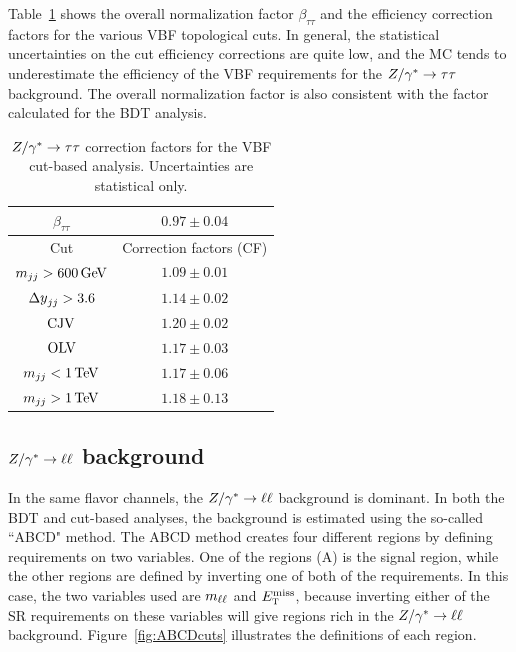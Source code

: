 Table~\ref{tab:vbf_cb_zttnf} shows the overall normalization factor $\beta_{\tau\tau}$ and the efficiency correction factors for the various VBF topological cuts. In general, the statistical uncertainties on the cut efficiency corrections are quite low, and the MC tends to underestimate the efficiency of the VBF requirements for the $Z/\gamma^{\ast}\to\tau\tau$ background. The overall normalization factor is also consistent with the factor calculated for the BDT analysis.

\begin{table}[h!]
\centering
\captionsetup{justification=centering}
\begin{tabular}{|c|c|}
\hline
$\beta_{\tau\tau}$ & $0.97 \pm 0.04$ \\ \hline\hline
 Cut & Correction factors (CF) \\ \hline
$\mjj > 600 \GeV$ & $1.09 \pm 0.01$ \\ \hline
$\dyjj > 3.6 $ & $1.14 \pm 0.02$ \\ \hline
$\rm CJV$ & $1.20 \pm 0.02$ \\ \hline
$\rm OLV$ & $1.17 \pm 0.03$ \\ \hline
$\mjj < 1 \TeV$ & $1.17 \pm 0.06$ \\ \hline
$\mjj > 1 \TeV$ & $1.18 \pm 0.13$ \\ \hline 
\end{tabular}
\caption{$Z/\gamma^{\ast} \to\tau\tau$ correction factors for the VBF cut-based analysis. Uncertainties are statistical only.}
\label{tab:vbf_cb_zttnf}
\end{table}

\subsection{$Z/\gamma^{\ast} \to \ell\ell$ background}

In the same flavor channels, the $Z/\gamma^{\ast} \to \ell\ell$ background is dominant. In both the BDT and cut-based analyses, the background is estimated using the so-called ``ABCD" method. The ABCD method creates four different regions by defining requirements on two variables. One of the regions (A) is the signal region, while the other regions are defined by inverting one of both of the requirements. In this case, the two variables used are $m_{\ell\ell}$ and $E_{\textrm{\footnotesize\sc t}}^{\rm miss}$, because inverting either of the SR requirements on these variables will give regions rich in the $Z/\gamma^{\ast}\to\ell\ell$ background. Figure~\ref{fig:ABCDcuts} illustrates the definitions of each region. 


